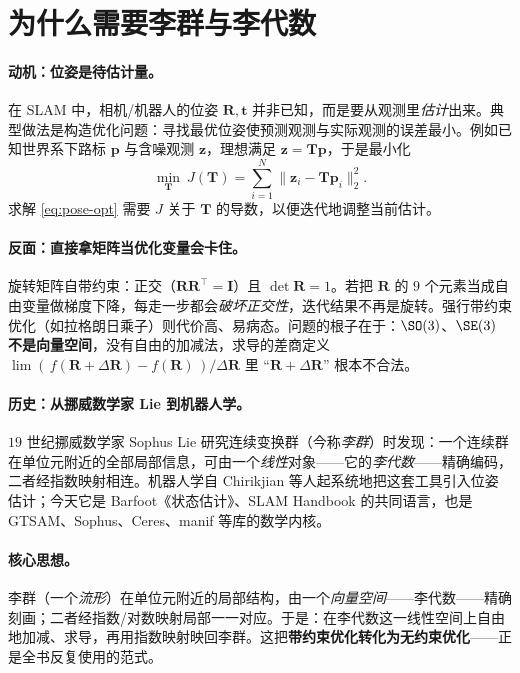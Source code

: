 \section{为什么需要李群与李代数}
\label{sec:why-lie}

\paragraph{动机：位姿是待估计量。}
在 SLAM 中，相机/机器人的位姿 $\mathbf{R},\mathbf{t}$ 并非已知，而是要从观测里\emph{估计}出来。典型做法是构造优化问题：寻找最优位姿使预测观测与实际观测的误差最小\cite{gaoxiang2019slam14}。例如已知世界系下路标 $\mathbf{p}$ 与含噪观测 $\mathbf{z}$，理想满足 $\mathbf{z}=\mathbf{T}\mathbf{p}$，于是最小化
\begin{equation}
  \min_{\mathbf{T}}\ J(\mathbf{T})=\sum_{i=1}^{N}\big\|\mathbf{z}_i-\mathbf{T}\mathbf{p}_i\big\|_2^2.
  \label{eq:pose-opt}
\end{equation}
求解 \cref{eq:pose-opt} 需要 $J$ 关于 $\mathbf{T}$ 的导数，以便迭代地调整当前估计。

\paragraph{反面：直接拿矩阵当优化变量会卡住。}
旋转矩阵自带约束：正交（$\mathbf{R}\mathbf{R}^\top=\mathbf{I}$）且 $\det\mathbf{R}=1$。若把 $\mathbf{R}$ 的 $9$ 个元素当成自由变量做梯度下降，每走一步都会\emph{破坏正交性}，迭代结果不再是旋转。强行带约束优化（如拉格朗日乘子）则代价高、易病态。问题的根子在于：$\SO(3)$、$\SE(3)$ \textbf{不是向量空间}，没有自由的加减法，求导的差商定义 $\lim(\,f(\mathbf{R}+\Delta\mathbf{R})-f(\mathbf{R})\,)/\Delta\mathbf{R}$ 里 “$\mathbf{R}+\Delta\mathbf{R}$” 根本不合法。

\paragraph{历史：从挪威数学家 Lie 到机器人学。}
$19$ 世纪挪威数学家 Sophus Lie 研究连续变换群（今称\emph{李群}）时发现：一个连续群在单位元附近的全部局部信息，可由一个\emph{线性}对象——它的\emph{李代数}——精确编码，二者经指数映射相连。机器人学自 Chirikjian\cite{chirikjian2011stochastic} 等人起系统地把这套工具引入位姿估计；今天它是 Barfoot《状态估计》\cite{barfoot2024state}、SLAM Handbook\cite{carlone2026handbook} 的共同语言，也是 GTSAM、Sophus、Ceres、manif 等库的数学内核。

\paragraph{核心思想。}
李群（一个\emph{流形}）在单位元附近的局部结构，由一个\emph{向量空间}——李代数——精确刻画；二者经指数/对数映射局部一一对应。于是：在李代数这一线性空间上自由地加减、求导，再用指数映射映回李群。这把\textbf{带约束优化转化为无约束优化}——正是全书反复使用的范式。


